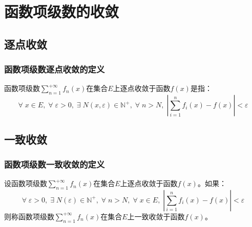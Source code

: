\section{函数项级数的收敛}

\subsection{逐点收敛}
\subsubsection{函数项级数逐点收敛的定义}
\begin{definition}
	函数项级数$\sum\limits_{n=1}^{+\infty}f_n(x)$在集合$E$上逐点收敛于函数$f(x)$是指：
	\begin{equation*}
		\forall\;x\in E,\;\forall\;\varepsilon>0,\;\exists\; N(x,\varepsilon)\in\mathbb{N}^+,\;\forall\;n>N,\;\left|\sum_{i=1}^{n}f_i(x)-f(x)\right|<\varepsilon
	\end{equation*}
\end{definition}

\subsection{一致收敛}
\subsubsection{函数项级数一致收敛的定义}
\begin{definition}
	设函数项级数$\sum\limits_{n=1}^{+\infty}f_n(x)$在集合$E$上逐点收敛于函数$f(x)$。如果：
	\begin{equation*}
		\forall\;\varepsilon>0,\;\exists\; N(\varepsilon)\in\mathbb{N}^+,\;\forall\;n>N,\;\forall\;x\in E,\;\left|\sum_{i=1}^{n}f_i(x)-f(x)\right|<\varepsilon
	\end{equation*}
	则称函数项级数$\sum\limits_{n=1}^{+\infty}f_n(x)$在集合$E$上一致收敛于函数$f(x)$。
\end{definition}
